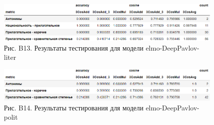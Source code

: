 \documentclass[a4paper,14pt]{article}
\begin{document}
\begin{figure}[H]
	\centering
	\includegraphics[width=0.9\linewidth]{image/res_elmo-DeepPavlov-liter }
	\caption*{Рис. B13. Результаты тестирования для модели elmo-DeepPavlov-liter }
	\label{fig:reselmo-DeepPavlov-liter }
\end{figure}

\begin{figure}[H]
	\centering
	\includegraphics[width=0.9\linewidth]{image/res_elmo-DeepPavlov-polit }
	\caption*{Рис. B14. Результаты тестирования для модели elmo-DeepPavlov-polit }
	\label{fig:reselmo-DeepPavlov-polit }
\end{figure}
\end{document}
